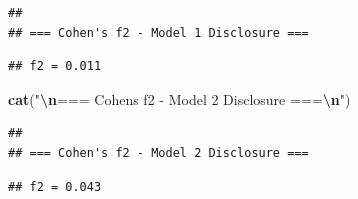 \documentclass[
]{article}
\newenvironment{Shaded}{\begin{snugshade}}{\end{snugshade}}
\newcommand{\DecValTok}[1]{\textcolor[rgb]{0.00,0.00,0.81}{#1}}
\newcommand{\FunctionTok}[1]{\textcolor[rgb]{0.13,0.29,0.53}{\textbf{#1}}}
\newcommand{\NormalTok}[1]{#1}
\newcommand{\SpecialCharTok}[1]{\textcolor[rgb]{0.81,0.36,0.00}{\textbf{#1}}}
\newcommand{\StringTok}[1]{\textcolor[rgb]{0.31,0.60,0.02}{#1}}
\begin{document}
\begin{verbatim}
## 
## === Cohen's f2 - Model 1 Disclosure ===
\end{verbatim}

\begin{Shaded}
\end{Shaded}

\begin{verbatim}
## f2 = 0.011
\end{verbatim}

\begin{Shaded}
\begin{Highlighting}[]
\FunctionTok{cat}\NormalTok{(}\StringTok{"}\SpecialCharTok{\textbackslash{}n}\StringTok{=== Cohen\textquotesingle{}s f2 {-} Model 2 Disclosure ===}\SpecialCharTok{\textbackslash{}n}\StringTok{"}\NormalTok{)}
\end{Highlighting}
\end{Shaded}

\begin{verbatim}
## 
## === Cohen's f2 - Model 2 Disclosure ===
\end{verbatim}

\begin{Shaded}
\end{Shaded}

\begin{verbatim}
## f2 = 0.043
\end{verbatim}
\end{document}

